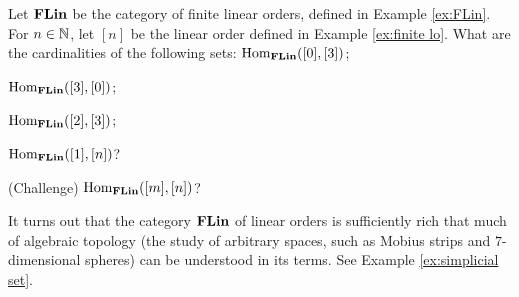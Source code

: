 \documentclass[CT4S-EN-RU]{subfiles}
\begin{document}
\begin{exampleRUS}\label{ex:FLin}
\end{exampleRUS}

\begin{exerciseENG}
Let ${\bf FLin}$ be the category of finite linear orders, defined in Example \ref{ex:FLin}. For $n\in{\mathbb N}$, let $[n]$ be the linear order defined in Example \ref{ex:finite lo}. What are the cardinalities of the following sets: 
\sexc $\textnormal{Hom}_{{\bf FLin}}([0],[3])$; 
\item $\textnormal{Hom}_{\bf FLin}([3],[0])$;
\item $\textnormal{Hom}_{\bf FLin}([2],[3])$;
\item $\textnormal{Hom}_{\bf FLin}([1],[n])$?
\item (Challenge) $\textnormal{Hom}_{\bf FLin}([m],[n])$?
\endsexc

It turns out that the category ${\bf FLin}$ of linear orders is sufficiently rich that much of algebraic topology (the study of arbitrary spaces, such as Mobius strips and $7$-dimensional spheres) can be understood in its terms. See Example \ref{ex:simplicial set}.
\end{exerciseENG}

\begin{exerciseRUS}
\end{exerciseRUS}
\end{document}
